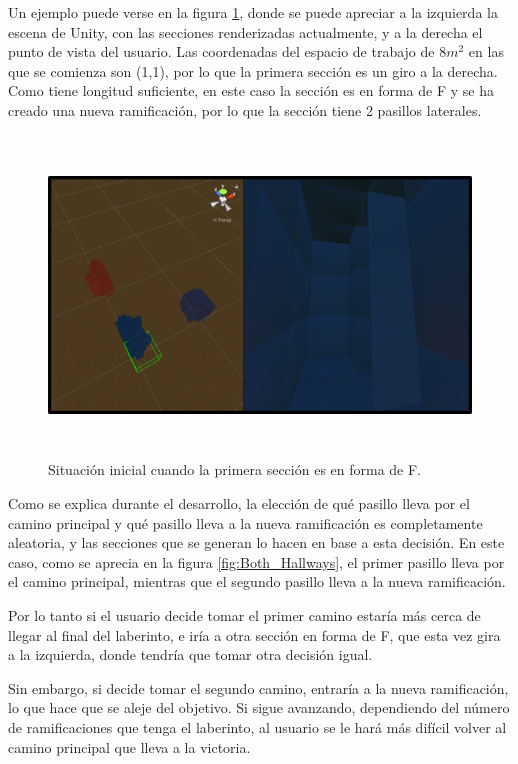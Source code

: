\documentclass[../main.tex]{subfiles}
\begin{document}
Un ejemplo puede verse en la figura \ref{fig:Gameplay_Example}, donde se puede apreciar a la izquierda la escena de Unity, con las secciones renderizadas actualmente, y a la derecha el punto de vista del usuario. Las coordenadas del espacio de trabajo  de $8m^2$ en las que se comienza son (1,1), por lo que la primera sección es un giro a la derecha. Como tiene longitud suficiente, en este caso la sección es en forma de F y se ha creado una nueva ramificación, por lo que la sección tiene 2 pasillos laterales.

\begin{figure}[h!]
\hspace{-1cm}
\includegraphics[width=14cm,height=8.5cm]{imagenes/Gameplay_Example.png}
\caption{Situación inicial cuando la primera sección es en forma de F.}
\label{fig:Gameplay_Example}
\end{figure}

Como se explica durante el desarrollo, la elección de qué pasillo lleva por el camino principal y qué pasillo lleva a la nueva ramificación es completamente aleatoria, y las secciones que se generan lo hacen en base a esta decisión. En este caso, como se aprecia en la figura \ref{fig:Both_Hallways}, el primer pasillo lleva por el camino principal, mientras que el segundo pasillo lleva a la nueva ramificación.

Por lo tanto si el usuario decide tomar el primer camino estaría más cerca de llegar al final del laberinto, e iría a otra sección en forma de F, que esta vez gira a la izquierda, donde tendría que tomar otra decisión igual. 

Sin embargo, si decide tomar el segundo camino, entraría a la nueva ramificación, lo que hace que se aleje del objetivo. Si sigue avanzando, dependiendo del número de ramificaciones que tenga el laberinto, al usuario se le hará más difícil volver al camino principal que lleva a la victoria.
\end{document}
